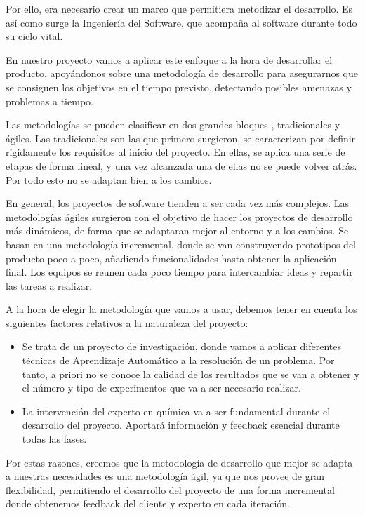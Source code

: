 Por ello, era necesario crear un marco que permitiera metodizar el desarrollo. Es así como surge la Ingeniería del Software, que acompaña al software durante todo su ciclo vital.

En nuestro proyecto vamos a aplicar este enfoque a la hora de desarrollar el producto, apoyándonos sobre una metodología de desarrollo para asegurarnos que se consiguen los objetivos en el tiempo previsto, detectando posibles amenazas y problemas a tiempo.

Las metodologías se pueden clasificar en dos grandes bloques \cite{metodologiasDesarrollo}, tradicionales y ágiles. Las tradicionales son las que primero surgieron, se caracterizan por definir rígidamente los requisitos al inicio del proyecto. En ellas, se aplica una serie de etapas de forma lineal, y una vez alcanzada una de ellas no se puede volver atrás. Por todo esto no se adaptan bien a los cambios.

En general, los proyectos de software tienden a ser cada vez más complejos. Las metodologías ágiles surgieron con el objetivo de hacer los proyectos de desarrollo más dinámicos, de forma que se adaptaran mejor al entorno y a los cambios. Se basan en una metodología incremental, donde se van construyendo prototipos del producto poco a poco, añadiendo funcionalidades hasta obtener la aplicación final. Los equipos se reunen cada poco tiempo para intercambiar ideas y repartir las tareas a realizar.

A la hora de elegir la metodología que vamos a usar, debemos tener en cuenta los siguientes factores relativos a la naturaleza del proyecto:

\begin{itemize}
    \item Se trata de un proyecto de investigación, donde vamos a aplicar diferentes técnicas de Aprendizaje Automático a la resolución de un problema. Por tanto, a priori no se conoce la calidad de los resultados que se van a obtener y el número y tipo de experimentos que va a ser necesario realizar.
    \item La intervención del experto en química va a ser fundamental durante el desarrollo del proyecto. Aportará información y feedback esencial durante todas las fases.
\end{itemize}

Por estas razones, creemos que la metodología de desarrollo que mejor se adapta a nuestras necesidades es una metodología ágil, ya que nos provee de gran flexibilidad, permitiendo el desarrollo del proyecto de una forma incremental donde obtenemos feedback del cliente y experto en cada iteración.

